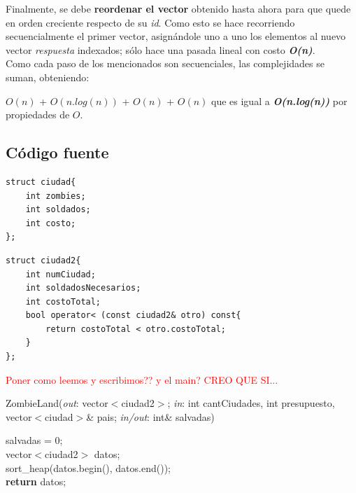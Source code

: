 \documentclass[a4paper]{article}
\begin{document}
Finalmente, se debe \textbf{reordenar el vector} obtenido hasta ahora para que quede en orden creciente respecto de su \textit{id}. Como esto se hace recorriendo secuencialmente el primer vector, asign\'andole uno a uno los elementos al nuevo vector \emph{respuesta} indexados; s\'olo hace una pasada lineal con costo \textbf{\textit{O(n)}}.\\



Como cada paso de los mencionados son secuenciales, las complejidades se suman, obteniendo:

 $O(n)$ + $O(n.log(n))$ + $O(n)$ + $O(n)$ que es igual a \textit{\textbf{O(n.log(n))}} por propiedades de $O$.


\newpage

\subsection{C\'odigo fuente}

	\begin{codesnippet}
	\begin{verbatim}
struct ciudad{
    int zombies;
    int soldados;
    int costo;
};
	\end{verbatim}
	\end{codesnippet}

	\begin{codesnippet}
	\begin{verbatim}
struct ciudad2{
    int numCiudad;
    int soldadosNecesarios;
    int costoTotal;
    bool operator< (const ciudad2& otro) const{
        return costoTotal < otro.costoTotal;
    }
};
	\end{verbatim}
	\end{codesnippet}

\textcolor{red}{Poner como leemos y escribimos?? y el main? CREO QUE SI...}


\begin{algorithm}[h!]
\caption{ZombieLand(\textit{out}: vector$<$ciudad2$>$; \textit{in}: int cantCiudades, int presupuesto, vector$<$ciudad$>$\& pais; \textit{in/out}:  int\& salvadas)}
salvadas = 0;\\
vector$<$ciudad2$>$ datos;\\
sort_heap(datos.begin(), datos.end());\\
\textbf{return} datos;
\end{algorithm}
\end{document}
